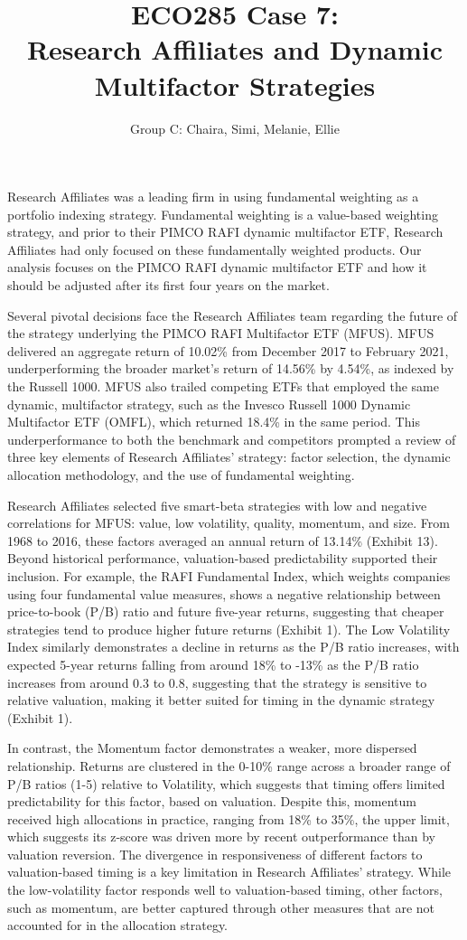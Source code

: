 \documentclass[
  letterpaper,
  DIV=11,
  numbers=noendperiod]{scrartcl}
\title{ECO285 Case 7:\\
Research Affiliates and Dynamic Multifactor Strategies}
\author{Group C: Chaira, Simi, Melanie, Ellie}
\date{}
\begin{document}
\maketitle

Research Affiliates was a leading firm in using fundamental weighting as
a portfolio indexing strategy. Fundamental weighting is a value-based
weighting strategy, and prior to their PIMCO RAFI dynamic multifactor
ETF, Research Affiliates had only focused on these fundamentally
weighted products. Our analysis focuses on the PIMCO RAFI dynamic
multifactor ETF and how it should be adjusted after its first four years
on the market.

Several pivotal decisions face the Research Affiliates team regarding
the future of the strategy underlying the PIMCO RAFI Multifactor ETF
(MFUS). MFUS delivered an aggregate return of 10.02\% from December 2017
to February 2021, underperforming the broader market's return of 14.56\%
by 4.54\%, as indexed by the Russell 1000. MFUS also trailed competing
ETFs that employed the same dynamic, multifactor strategy, such as the
Invesco Russell 1000 Dynamic Multifactor ETF (OMFL), which returned
18.4\% in the same period. This underperformance to both the benchmark
and competitors prompted a review of three key elements of Research
Affiliates' strategy: factor selection, the dynamic allocation
methodology, and the use of fundamental weighting.

Research Affiliates selected five smart-beta strategies with low and
negative correlations for MFUS: value, low volatility, quality,
momentum, and size. From 1968 to 2016, these factors averaged an annual
return of 13.14\% (Exhibit 13). Beyond historical performance,
valuation-based predictability supported their inclusion. For example,
the RAFI Fundamental Index, which weights companies using four
fundamental value measures, shows a negative relationship between
price-to-book (P/B) ratio and future five-year returns, suggesting that
cheaper strategies tend to produce higher future returns (Exhibit 1).
The Low Volatility Index similarly demonstrates a decline in returns as
the P/B ratio increases, with expected 5-year returns falling from
around 18\% to -13\% as the P/B ratio increases from around 0.3 to 0.8,
suggesting that the strategy is sensitive to relative valuation, making
it better suited for timing in the dynamic strategy (Exhibit 1).

In contrast, the Momentum factor demonstrates a weaker, more dispersed
relationship. Returns are clustered in the 0-10\% range across a broader
range of P/B ratios (1-5) relative to Volatility, which suggests that
timing offers limited predictability for this factor, based on
valuation. Despite this, momentum received high allocations in practice,
ranging from 18\% to 35\%, the upper limit, which suggests its z-score
was driven more by recent outperformance than by valuation reversion.
The divergence in responsiveness of different factors to valuation-based
timing is a key limitation in Research Affiliates' strategy. While the
low-volatility factor responds well to valuation-based timing, other
factors, such as momentum, are better captured through other measures
that are not accounted for in the allocation strategy.
\end{document}
